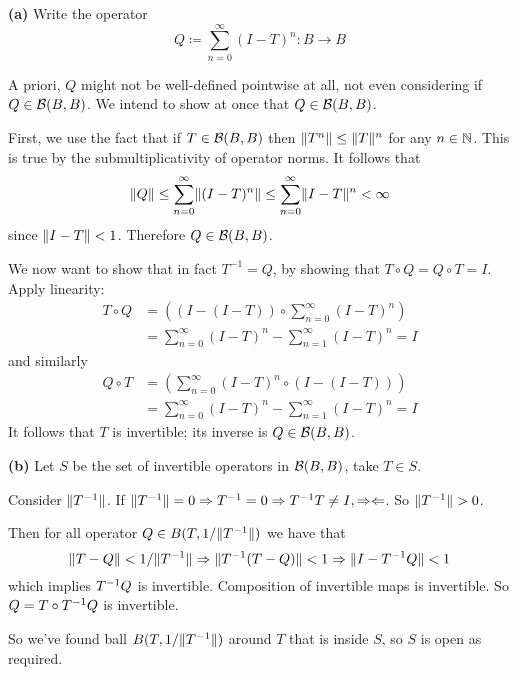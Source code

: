 \documentclass[a4paper, 10pt]{article}
\begin{document}
\begin{solution}
    \textbf{(a)} Write the operator \begin{equation*}
    Q \coloneqq \sum_{n=0}^{\infty} (I-T)^n : B \to B
    \end{equation*}

    A priori, $Q$ might not be well-defined pointwise at all, not even considering if $Q \in \mathcal{B}(B, B)$. We intend to show at once that $Q \in \mathcal{B}(B, B)$.

    First, we use the fact that if $T \in \mathcal{B}(B, B)$ then $\lVert T^n\rVert \leq \lVert T\rVert^n$ for any $n \in \mathbb{N}$. This is true by the submultiplicativity of operator norms. It follows that 
     \begin{equation*}
        \lVert Q\rVert \leq \sum_{n= 0}^{\infty} \lVert(I-T)^n\rVert \leq \sum_{n= 0}^{\infty} \lVert I-T\rVert^n < \infty
    \end{equation*}
    since $\lVert I-T\rVert < 1$. Therefore $Q \in \mathcal{B}(B, B)$.

    We now want to show that in fact $T^{-1} = Q$, by showing that $T \circ Q = Q \circ T = I$. Apply linearity:
    \begin{align*}
        T \circ Q &= \left((I - (I-T)) \circ \sum_{n=0}^{\infty} (I-T)^n\right) \\
        &= \sum_{n=0}^{\infty} (I-T)^n - \sum_{n=1}^{\infty}(I-T)^n = I
    \end{align*}
    and similarly
    \begin{align*}
        Q \circ T &= \left(\sum_{n=0}^{\infty} (I-T)^n \circ (I - (I-T))\right) \\
        &= \sum_{n=0}^{\infty} (I-T)^n - \sum_{n=1}^{\infty}(I-T)^n = I
    \end{align*}
    It follows that $T$ is invertible; its inverse is $Q \in \mathcal{B}(B, B)$.

    \textbf{(b)} Let $S$ be the set of invertible operators in $\mathcal{B}(B, B)$, take $T \in S$.

    Consider $\lVert{T}^{-1}\rVert$. If $\lVert{T}^{-1}\rVert = 0 \Rightarrow {T}^{-1} = 0 \Rightarrow {T}^{-1}T \neq I, \Rightarrow\Leftarrow$. So $\lVert{T}^{-1}\rVert > 0$. 
    
    Then for all operator $Q \in B(T, 1/\lVert{T}^{-1}\rVert)$ we have that
    \begin{equation*}
    \lVert T - Q\rVert < 1/\lVert{T}^{-1}\rVert \Rightarrow \lVert{T}^{-1}(T - Q)\rVert < 1 \Rightarrow \lVert I - {T}^{-1}Q\rVert < 1
    \end{equation*}
    which implies ${T}^{-1}Q$ is invertible. Composition of invertible maps is invertible. So $Q = T \circ {T}^{-1}Q$ is invertible.

    So we've found ball $B(T, 1/\lVert{T}^{-1}\rVert)$ around $T$ that is inside $S$, so $S$ is open as required.
\end{solution}
\end{document}
